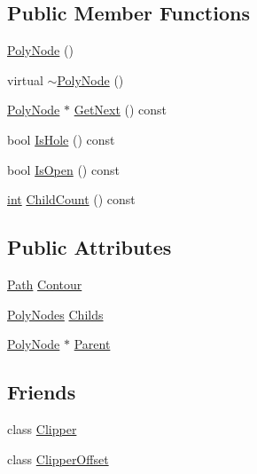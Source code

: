 \subsection*{Public Member Functions}
\begin{DoxyCompactItemize}
\item 
\mbox{\hyperlink{class_clipper_lib_1_1_poly_node_a12b3350e7ab93fb0002b2b4d7dcf13ba}{Poly\+Node}} ()
\item 
virtual \mbox{\hyperlink{class_clipper_lib_1_1_poly_node_abca566308c95d19c72dee88217b23064}{$\sim$\+Poly\+Node}} ()
\item 
\mbox{\hyperlink{class_clipper_lib_1_1_poly_node}{Poly\+Node}} $\ast$ \mbox{\hyperlink{class_clipper_lib_1_1_poly_node_adbcb861001d8bfbd609c4ba4f4a19a58}{Get\+Next}} () const
\item 
bool \mbox{\hyperlink{class_clipper_lib_1_1_poly_node_a0467801cae1b28ad8a4917b96e551536}{Is\+Hole}} () const
\item 
bool \mbox{\hyperlink{class_clipper_lib_1_1_poly_node_ac9ade640af2515976d337b65e8e84776}{Is\+Open}} () const
\item 
\mbox{\hyperlink{draw_8hh_aa620a13339ac3a1177c86edc549fda9b}{int}} \mbox{\hyperlink{class_clipper_lib_1_1_poly_node_a19128db6fb2aca66555231edaffa7ade}{Child\+Count}} () const
\end{DoxyCompactItemize}
\subsection*{Public Attributes}
\begin{DoxyCompactItemize}
\item 
\mbox{\hyperlink{namespace_clipper_lib_af39c8fe00f278f18cc8142fef41242da}{Path}} \mbox{\hyperlink{class_clipper_lib_1_1_poly_node_a1d08b8a9499ff8cb89d5d63a12f881ea}{Contour}}
\item 
\mbox{\hyperlink{namespace_clipper_lib_ac9381bbff6b966df41b78667385b9c1e}{Poly\+Nodes}} \mbox{\hyperlink{class_clipper_lib_1_1_poly_node_a7ac59aea508951a4c979bfca8913261d}{Childs}}
\item 
\mbox{\hyperlink{class_clipper_lib_1_1_poly_node}{Poly\+Node}} $\ast$ \mbox{\hyperlink{class_clipper_lib_1_1_poly_node_a9465bc02623316de2af3ab52c6f7041e}{Parent}}
\end{DoxyCompactItemize}
\subsection*{Friends}
\begin{DoxyCompactItemize}
\item 
class \mbox{\hyperlink{class_clipper_lib_1_1_poly_node_a4d39a09ecdddeeb85930dd4554a54b3c}{Clipper}}
\item 
class \mbox{\hyperlink{class_clipper_lib_1_1_poly_node_adadfb8ac9a17a5c8fb7b4f012075b975}{Clipper\+Offset}}
\end{DoxyCompactItemize}


